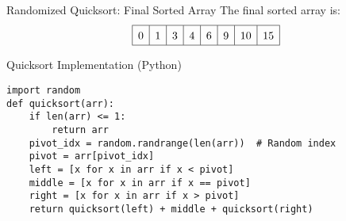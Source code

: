 \begin{frame}{Randomized Quicksort: Final Sorted Array}
  The final sorted array is:
  \[
    \renewcommand{\arraystretch}{1.5}
    \begin{array}{|c|c|c|c|c|c|c|c|}
      \hline
      0 & 1 & 3 & 4 & 6 & 9 & 10 & 15 \\
      \hline
    \end{array}
  \]
\end{frame}

\begin{frame}[fragile]{Quicksort Implementation (Python)}
  \begin{lstlisting}
import random
def quicksort(arr):
    if len(arr) <= 1:
        return arr
    pivot_idx = random.randrange(len(arr))  # Random index
    pivot = arr[pivot_idx]
    left = [x for x in arr if x < pivot]
    middle = [x for x in arr if x == pivot]
    right = [x for x in arr if x > pivot]
    return quicksort(left) + middle + quicksort(right)
  \end{lstlisting}
\end{frame}